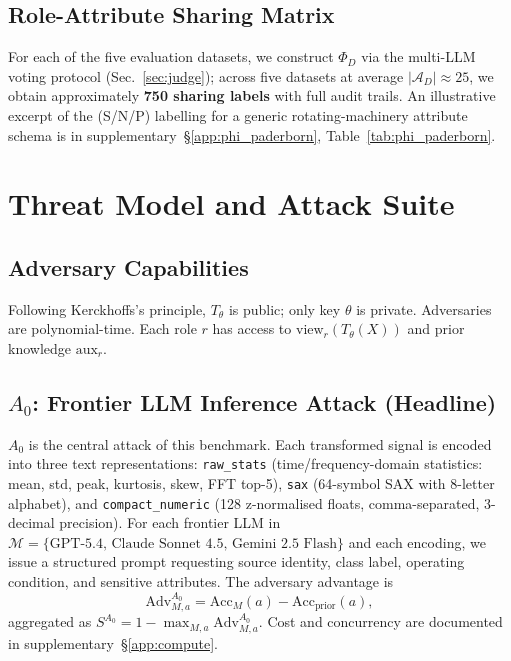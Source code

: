 \documentclass{article}
\theoremstyle{remark}
\newcommand{\Adv}{\mathrm{Adv}}
\newcommand{\Acc}{\mathrm{Acc}}
\newcommand{\view}{\mathrm{view}}
\begin{document}
\subsection{Role-Attribute Sharing Matrix}
For each of the five evaluation datasets, we construct $\Phi_D$ via the multi-LLM voting protocol (Sec.~\ref{sec:judge}); across five datasets at average $|\mathcal{A}_D| \approx 25$, we obtain approximately \textbf{750 sharing labels} with full audit trails. An illustrative excerpt of the (S/N/P) labelling for a generic rotating-machinery attribute schema is in supplementary~\S\ref{app:phi_paderborn}, Table~\ref{tab:phi_paderborn}.

\section{Threat Model and Attack Suite}
\label{sec:attacks}

\subsection{Adversary Capabilities}
Following Kerckhoffs's principle, $T_\theta$ is public; only key $\theta$ is private. Adversaries are polynomial-time. Each role $r$ has access to $\view_r(T_\theta(X))$ and prior knowledge $\text{aux}_r$.

\subsection{$A_0$: Frontier LLM Inference Attack (Headline)}
\label{sec:a0}

$A_0$ is the central attack of this benchmark. Each transformed signal is encoded into three text representations: \texttt{raw\_stats} (time/frequency-domain statistics: mean, std, peak, kurtosis, skew, FFT top-5), \texttt{sax} (64-symbol SAX with 8-letter alphabet), and \texttt{compact\_numeric} (128 z-normalised floats, comma-separated, 3-decimal precision). For each frontier LLM in $\mathcal{M} = \{\text{GPT-5.4, Claude Sonnet 4.5, Gemini 2.5 Flash}\}$ and each encoding, we issue a structured prompt requesting source identity, class label, operating condition, and sensitive attributes. The adversary advantage is
\[
\Adv^{A_0}_{M, a} = \Acc_M(a) - \Acc_{\text{prior}}(a),
\]
aggregated as $S^{A_0} = 1 - \max_{M, a} \Adv^{A_0}_{M, a}$. Cost and concurrency are documented in supplementary~\S\ref{app:compute}.
\end{document}
